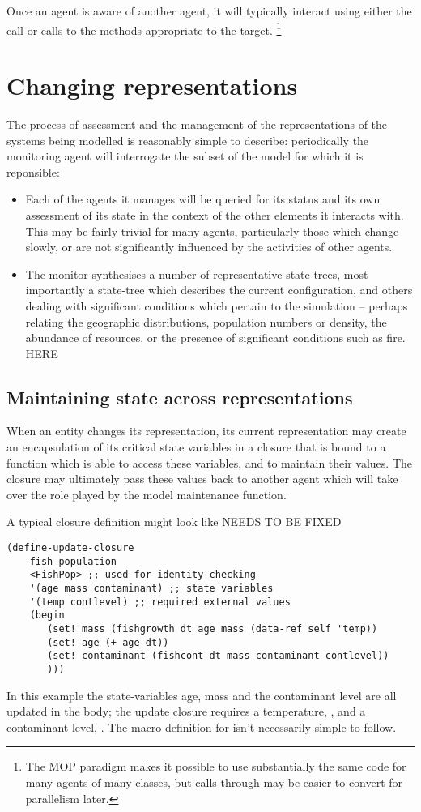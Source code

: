 Once an agent is aware of another agent, it will typically interact
using either the  call or calls to the methods
appropriate to the target. \footnote{The MOP paradigm makes it possible to use
substantially the same code for many agents of many classes, but calls
through  may be easier to convert for parallelism later.}

\section{Changing representations}

The process of assessment and the management of the representations
of the systems being modelled is reasonably simple to describe:
periodically the monitoring agent will interrogate the subset of the
model for which it is reponsible:
\begin{itemize}
\item[] Each of the agents it manages will be queried for its status
and its own assessment of its state in the context of the other
elements it interacts with.  This may be fairly trivial for many
agents, particularly those which change slowly, or are not
significantly influenced by the activities of other agents.
\item[] The monitor synthesises a number of representative
state-trees, most importantly a state-tree which describes the current
configuration, and others dealing with significant conditions which
pertain to the simulation -- perhaps relating the geographic
distributions, population numbers or density, the abundance of
resources, or the presence of significant conditions such as fire.
{\Huge{HERE}}
\end{itemize}


\subsection{Maintaining state across representations}

When an entity changes its representation, its current representation
may create an encapsulation of its critical state variables in a
closure that is bound to a function which is able to access these
variables, and to maintain their values. The closure may ultimately pass these
values back to another agent which will take over the role played by
the model maintenance function.

A typical closure definition might look like
\Huge{NEEDS TO BE FIXED}
\begin{verbatim}
(define-update-closure 
    fish-population
    <FishPop> ;; used for identity checking
    '(age mass contaminant) ;; state variables 
    '(temp contlevel) ;; required external values
    (begin
       (set! mass (fishgrowth dt age mass (data-ref self 'temp))
       (set! age (+ age dt))
       (set! contaminant (fishcont dt mass contaminant contlevel))
       )))
\end{verbatim}
In this example the state-variables age, mass and the contaminant
level are all updated in the body; the update closure requires a
temperature, , and a contaminant level, .
The macro definition for  isn't
necessarily simple to follow.

